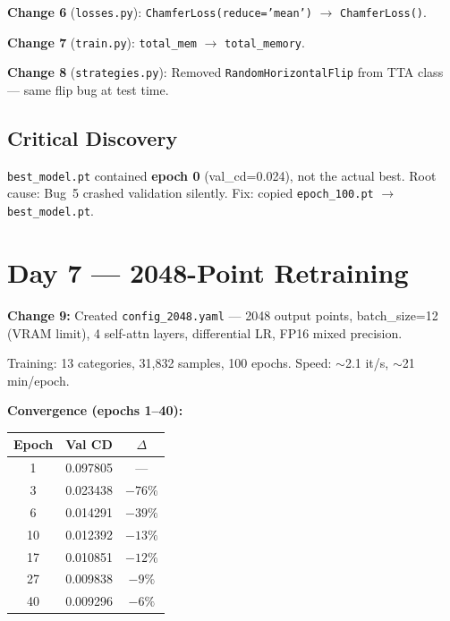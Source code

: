 \documentclass[10pt,twocolumn,letterpaper]{article}
\begin{document}
\textbf{Change 6} (\texttt{losses.py}): \texttt{ChamferLoss(reduce='mean')} $\to$ \texttt{ChamferLoss()}.

\textbf{Change 7} (\texttt{train.py}): \texttt{total\_mem} $\to$ \texttt{total\_memory}.

\textbf{Change 8} (\texttt{strategies.py}): Removed \texttt{RandomHorizontalFlip} from TTA class --- same flip bug at test time.

\subsection{Critical Discovery}

\texttt{best\_model.pt} contained \textbf{epoch 0} (val\_cd=0.024), not the actual best. Root cause: Bug~5 crashed validation silently. Fix: copied \texttt{epoch\_100.pt} $\to$ \texttt{best\_model.pt}.

\section{Day 7 --- 2048-Point Retraining}

\textbf{Change 9:} Created \texttt{config\_2048.yaml} --- 2048 output points, batch\_size=12 (VRAM limit), 4 self-attn layers, differential LR, FP16 mixed precision.

Training: 13 categories, 31,832 samples, 100 epochs.
Speed: $\sim$2.1 it/s, $\sim$21 min/epoch.

\textbf{Convergence (epochs 1--40):}

\begin{table}[h]
\centering
\scriptsize
\begin{tabular}{@{}ccc@{}}
\toprule
\textbf{Epoch} & \textbf{Val CD} & \textbf{$\Delta$} \\
\midrule
1 & 0.097805 & --- \\
3 & 0.023438 & $-76\%$ \\
6 & 0.014291 & $-39\%$ \\
10 & 0.012392 & $-13\%$ \\
17 & 0.010851 & $-12\%$ \\
27 & 0.009838 & $-9\%$ \\
40 & 0.009296 & $-6\%$ \\
\bottomrule
\end{tabular}
\end{table}
\end{document}
